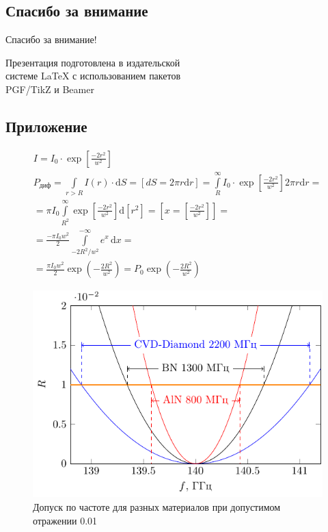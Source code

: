 \subsection{Спасибо за внимание}
\begin{frame}[plain]
	\vspace{4cm}
	\begin{center}
		\Huge
		Спасибо за внимание!
	\end{center}
	\vspace{2.5cm}
	\begin{center}
		\color{black!30!white}
		Презентация подготовлена в издательской \\
		системе LaTeX с использованием пакетов \\
		PGF/TikZ и Beamer
	\end{center}
\end{frame}

\subsection{Приложение}
\begin{frame}[plain]
	\begin{gather*}
		I=I_0\cdot\exp\left[\frac{-2r^2}{w^2}\right]
		\\%
		P_\text{диф}=\int\limits_{r>R}I(r)\cdot\mathrm{d}S=[dS=2\pi r \mathrm{d}r]=
		\int\limits_{R}^{\infty} I_0\cdot\exp\left[\frac{-2r^2}{w^2}\right] 2\pi r \mathrm{d}r=\\=
		\pi I_0\int\limits_{R^2}^{\infty}\exp\left[\frac{-2r^2}{w^2}\right] \mathrm{d}\left[r^2\right]=
		\left[x=\left[\frac{-2r^2}{w^2}\right]\right]
		=\\=
		\frac{-\pi I_0 w^2}{2}\int\limits_{-2R^2/w^2}^{-\infty} e^x \,\mathrm{d}x=\\=
		\frac{\pi I_0 w^2}{2}\exp\left(-\frac{2R^2}{w^2}\right)=P_0\exp\left(-\frac{2R^2}{w^2}\right)
	\end{gather*}
\end{frame}

\begin{frame}[plain]
	\begin{figure}[tb]
		\centering
		\includegraphics[]{ris/Rf}
		\caption{Допуск по частоте для разных материалов при допустимом отражении 0.01}
		\label{fig:figure1}
	\end{figure}
\end{frame}
